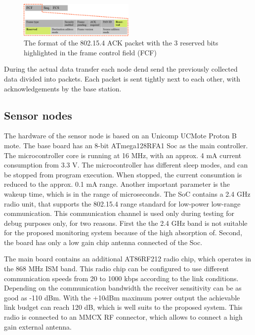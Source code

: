 \documentclass[conference]{IEEEtran}
\begin{document}
\begin{figure}[htbp]
	\centering
	\includegraphics[width=0.5\textwidth]{fig/ack-packet.png}
  \caption{The format of the 802.15.4 ACK packet with the 3 reserved bits highlighted
  in the frame control field (FCF)}
	\label{fig-ack-packet}
\end{figure}

During the actual data transfer each node dend send the
previously collected data divided into packets. Each packet is sent
tightly next to each other, with acknowledgements by the base station.





\subsection{Sensor nodes}

The hardware of the sensor node is based on an Unicomp UCMote Proton B mote.
The base board has an 8-bit ATmega128RFA1 Soc as the main controller. The
microcontroller core is running at 16 MHz, with an approx. 4 mA current
consumption from 3.3 V. The microcontroller has different sleep modes,
and can be stopped from program execution. When stopped, the current consumtion
is reduced to the approx. 0.1 mA range. Another important parameter is the wakeup time,
which is in the range of microseconds. The SoC contains a 2.4 GHz radio unit,
that supports the 802.15.4 range standard for low-power low-range communication.
This communication channel is used only during testing for debug purposes only,
for two reasons. First the the 2.4 GHz band is not suitable for the proposed
monitoring system because of the high absorption of. Second, the board has
only a low gain chip antenna connected of the Soc.

The main board contains an additional AT86RF212 radio chip, which operates in
the 868 MHz ISM band. This radio chip can be configured to use different
communication speeds from 20 to 1000 kbps according to the link conditions.
Depending on the communication bandwidth the receiver sensitivity can be as good as
-110 dBm. With the +10dBm maximum power output the achievable link budget can
reach 120 dB, which is well suits to the proposed system. This radio is connected to
an MMCX RF connector, which allows to connect a high gain external antenna.
\end{document}
